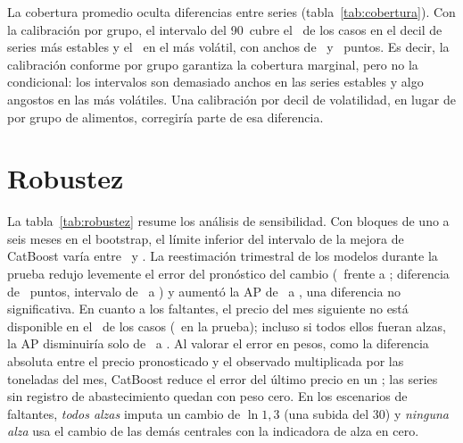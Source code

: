 

La cobertura promedio oculta diferencias entre series (tabla~\ref{tab:cobertura}). Con la calibración por grupo, el intervalo del 90\pct\ cubre el \rvcobdecuno\pct\ de los casos en el decil de series más estables y el \rvcobdecdiez\pct\ en el más volátil, con anchos de \rvanchdecuno\ y \rvanchdecdiez\ puntos. Es decir, la calibración conforme por grupo garantiza la cobertura marginal, pero no la condicional: los intervalos son demasiado anchos en las series estables y algo angostos en las más volátiles. Una calibración por decil de volatilidad, en lugar de por grupo de alimentos, corregiría parte de esa diferencia.




\section{Robustez}
\label{sec:res_robustez}

La tabla~\ref{tab:robustez} resume los análisis de sensibilidad. Con bloques de uno a seis meses en el bootstrap, el límite inferior del intervalo de la mejora de CatBoost varía entre \csenslo\pct\ y \csenshi\pct. La reestimación trimestral de los modelos durante la prueba redujo levemente el error del pronóstico del cambio (\commovil\ frente a \comfijo; diferencia de \comd\ puntos, intervalo de \comdlo\ a \comdhi) y aumentó la AP de \comprf\ a \comprm, una diferencia no significativa. En cuanto a los faltantes, el precio del mes siguiente no está disponible en el \cfatasa\pct\ de los casos (\cfatasap\pct\ en la prueba); incluso si todos ellos fueran alzas, la AP disminuiría solo de \cfapro\ a \cfaprt. Al valorar el error en pesos, como la diferencia absoluta entre el precio pronosticado y el observado multiplicada por las toneladas del mes, CatBoost reduce el error del último precio en un \cvale\pct; las series sin registro de abastecimiento quedan con peso cero. En los escenarios de faltantes, \emph{todos alzas} imputa un cambio de $\ln 1{,}3$ (una subida del 30\pct) y \emph{ninguna alza} usa el cambio de las demás centrales con la indicadora de alza en cero.

